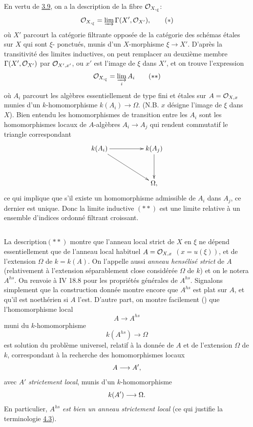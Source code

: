 \documentclass[10pt]{../fichiers-configuration-latex/smfart}
\begin{document}
En vertu de \hyperref[VIII.prop3.9]{3.9}, on a la description
de la fibre ${\mathcal O}_{{X,}_{\xi}}$:
\begin{equation*}
{\mathcal O}_{{X,}_{\xi}} = \varinjlim \Gamma (X', {\mathcal O}_{X'}){},\tag{$\ast$}
\end{equation*}
où $X'$ parcourt la catégorie filtrante opposée de la catégorie des
schémas étales sur $X$ qui sont $\xi$- ponctués, \ie munis d'un
$X$-morphisme $\xi \to X'$. D'après la transitivité des limites
inductives, on peut remplacer au deuxième membre $\Gamma (X',
{\mathcal O}_{X'})$ par ${\mathcal O}_{X', x'}$, ou $x'$ est l'image de $\xi$ dans
$X'$, et on trouve l'expression
\begin{equation*}
\Oo_{{X,}_{\xi}} = \varinjlim_{i} A_i \tag{${\ast}{\ast}$}
\end{equation*}
où $A_i$ parcourt les algèbres essentiellement de type fini et
étales sur $A = {\mathcal O}_{X, x}$ munies d'un $k$-homomorphisme $k(A_i)
\to \Omega$. (N.B. $x$ désigne l'image de $\xi$ dans $X$). Bien
entendu les homomorphismes de transition entre les $A_i$ sont les
homomorphismes locaux de $A$-algèbres $A_i \to A_j$ qui rendent
commutatif le triangle correspondant
\[
\xymatrix@R=1.25cm@C=1.75cm{
k(A_i)  \ar[r] \ar[rd]& k(A_j)\ar[d]    \\
                      &  \Omega,
}
\]
ce qui implique que s'il existe un homomorphisme admissible de $A_i$
dans $A_j$, ce dernier est unique. Donc la limite inductive $({\ast}
{\ast})$ est une limite relative à un ensemble d'indices ordonné
filtrant croissant.

\setcounter{subsection}{3}
\subsection{}

La description\pageoriginale $({\ast}{\ast})$ montre que l'anneau
local strict de $X$
en $\xi$ ne dépend essentiellement que de l'anneau local habituel $A =
{\mathcal O}_{X, x}$ $(x = u(\xi))$, et de l'extension $\Omega$ de $k =
k(A)$. On l'appelle aussi \emph{anneau hensélisé strict} de $A$
(relativement à l'extension séparablement close considérée $\Omega$ de
$k$) et on le notera $A^{hs}$. On renvoie à \EGA IV 18.8 pour les
propriétés générales de $A^{hs}$.
Signalons simplement que la
construction donnée montre encore que $A^{hs}$ est plat sur $A$, et
qu'il est noethérien si $A$ l'est. D'autre part, on montre facilement
(\loccit) que l'homomorphisme local
$$
A \to A^{hs}
$$
muni du $k$-homomorphisme
$$
k(A^{hs}) \to \Omega
$$
est solution du problème universel, relatif à la donnée de $A$ et de
l'extension $\Omega$ de $k$, correspondant à la recherche des
homomorphismes locaux
$$
A \to A'{\quoi},
$$
avec $A'$ \emph{strictement local}, munis d'un $k$-homomorphisme
$$
k(A') \to \Omega{\quoi}.
$$
En particulier, $A^{hs}$  \emph{est bien un anneau strictement local} (ce
qui justifie la terminologie \hyperref[VIII.def4.3]{4.3}).
\end{document}
